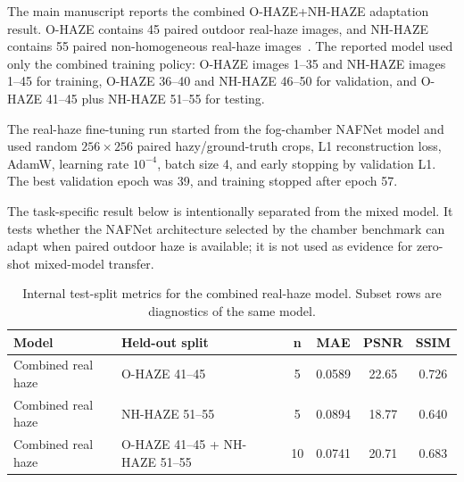 \documentclass[9pt]{osa-supplemental-document}
\begin{document}
The main manuscript reports the combined O-HAZE+NH-HAZE adaptation result. O-HAZE contains 45 paired outdoor real-haze images, and NH-HAZE contains 55 paired non-homogeneous real-haze images~\cite{ancuti2018ohaze,ancuti2020nhhaze}. The reported model used only the combined training policy: O-HAZE images 1--35 and NH-HAZE images 1--45 for training, O-HAZE 36--40 and NH-HAZE 46--50 for validation, and O-HAZE 41--45 plus NH-HAZE 51--55 for testing.

The real-haze fine-tuning run started from the fog-chamber NAFNet model and used random $256 \times 256$ paired hazy/ground-truth crops, L1 reconstruction loss, AdamW, learning rate $10^{-4}$, batch size 4, and early stopping by validation L1. The best validation epoch was 39, and training stopped after epoch 57.

The task-specific result below is intentionally separated from the
mixed model. It tests whether the NAFNet architecture selected by the
chamber benchmark can adapt when paired outdoor haze is available;
it is not used as evidence for zero-shot mixed-model transfer.

\begin{table}[H]
\centering
\scriptsize
\caption{Supervised combined real-haze adaptation protocol and split audit. Image identity was checked as dataset/image-id pairs across train, validation, and test records.}
\label{tabS:external_training_protocol}
\end{table}

\begin{table}[H]
\centering
\small
\caption{Internal test-split metrics for the combined real-haze model. Subset rows are diagnostics of the same model.}
\label{tabS:external_heldout}
\begin{tabular}{@{}>{\raggedright\arraybackslash}p{}>{\raggedright\arraybackslash}p{}cccc@{}}
\toprule
\textbf{Model} & \textbf{Held-out split} & \textbf{n} & \textbf{MAE} & \textbf{PSNR} & \textbf{SSIM} \\
\midrule
Combined real haze & O-HAZE 41--45 & 5 & 0.0589 & 22.65 & 0.726 \\
Combined real haze & NH-HAZE 51--55 & 5 & 0.0894 & 18.77 & 0.640 \\
Combined real haze & O-HAZE 41--45 + NH-HAZE 51--55 & 10 & 0.0741 & 20.71 & 0.683 \\
\bottomrule
\end{tabular}
\end{table}
\FloatBarrier
\end{document}
